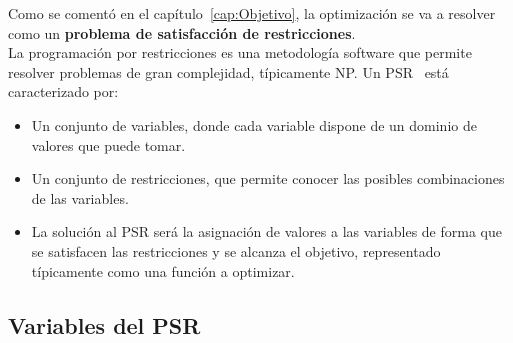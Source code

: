 Como se comentó en el capítulo~\ref{cap:Objetivo}, la optimización se va a resolver como un \textbf{problema de satisfacción de restricciones}.\\

La programación por restricciones es una metodología software que permite resolver problemas de gran complejidad, típicamente NP. Un \gls{PSR}~\cite{Russ06} está caracterizado por:
\begin{itemize}
	\item Un conjunto de variables, donde cada variable dispone de un dominio de valores que puede tomar.
	\item Un conjunto de restricciones, que permite conocer las posibles combinaciones de las variables.
	\item La solución al PSR será la asignación de valores a las variables de forma que se satisfacen las restricciones y se alcanza el objetivo, representado típicamente como una función a optimizar.
\end{itemize}

\subsection{Variables del PSR}

